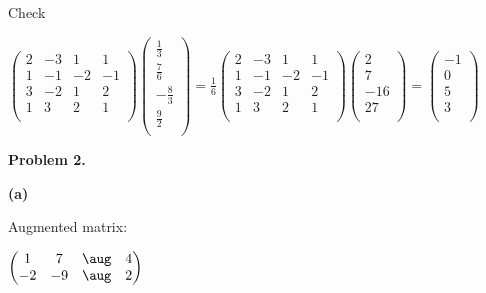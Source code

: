 \documentclass[oneside,12pt]{amsart}
\begin{document}
\bigskip

Check

\bigskip

$
\begin{pmatrix}
 2  & -3 &  1 &  1 \\
 1  & -1 & -2 & -1 \\
 3  & -2 &  1 &  2 \\
 1  &  3 &  2 &  1 \\
\end{pmatrix}
\begin{pmatrix}
\frac{1}{3}  \\[6pt]
\frac{7}{6}  \\[6pt]
-\frac{8}{3} \\[6pt]
\frac{9}{2} \\[6pt]
\end{pmatrix}
=
\frac{1}{6}
\begin{pmatrix}
2  & -3 &  1 &  1 \\
1  & -1 & -2 & -1 \\
3  & -2 &  1 &  2 \\
1  &  3 &  2 &  1 \\
\end{pmatrix}
\begin{pmatrix}
2  \\
7  \\
-16 \\
27 \\
\end{pmatrix}
=
\begin{pmatrix}
-1 \\
0 \\
5 \\
3 \\
\end{pmatrix}
$

\bigskip

\textbf{Problem 2.}

\bigskip


\textbf{(a)}

Augmented matrix:

\bigskip

$
\begin{pmatrix}
   1  &  7  & \aug & 4  \\
  -2  & -9  & \aug & 2  \\
\end{pmatrix}
$

\bigskip
\end{document}
